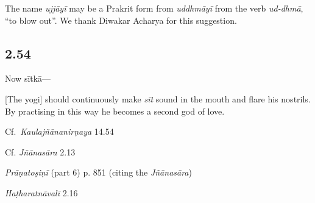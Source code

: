 \begin{ekdosis}
\begin{philcomm}[hp02_053]
The name \emph{ujjāyī} may be a Prakrit form from \emph{uddhmāyī} from the verb \emph{ud-dhmā}, “to blow out”. We thank Diwakar Acharya for this suggestion.

\end{philcomm}

\subsection*{2.54}
\begin{translation}[hp02_054]
Now sītkā---

{}[The yogi] should continuously make \emph{sīt} sound in the mouth and flare his nostrils. By practising in this way he becomes a second god of love.
\end{translation} 

\begin{sources}[hp02_054]
Cf.~\emph{Kaulajñānanirṇaya} 14.54

\begin{versinnote}
\end{versinnote}

Cf. \emph{Jñānasāra} 2.13

\begin{versinnote}
\end{versinnote}

\emph{Prāṇatoṣiṇī} (part 6) p. 851 (citing the \emph{Jñānasāra})

\begin{versinnote}
\end{versinnote}
\end{sources}

\begin{testimonia}[hp02_054]
\emph{Haṭharatnāvalī} 2.16

\begin{versinnote}
\end{versinnote} 


\end{testimonia}
\end{ekdosis}
